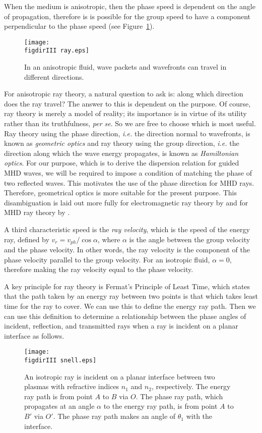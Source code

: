 	When the medium is anisotropic, then the phase speed is dependent on the angle of propagation, therefore is is possible for the group speed to have a component perpendicular to the phase speed (see Figure~\ref{fig: anisotropic ray direction}).
	\begin{figure}
		\centering
		\texttt{[image: \\figdirIII ray.eps]}
		\caption{In an anisotropic fluid, wave packets and wavefronts can travel in different directions.}
		\label{fig: anisotropic ray direction}
	\end{figure}
	For anisotropic ray theory, a natural question to ask is: along which direction does the ray travel? The answer to this is dependent on the purpose. Of course, ray theory is merely a model of reality; its importance is in virtue of its utility rather than its truthfulness, \textit{per se}. So we are free to choose which is most useful. Ray theory using the phase direction, \textit{i.e.} the direction normal to wavefronts, is known as \textit{geometric optics} and ray theory using the group direction, \textit{i.e.} the direction along which the wave energy propagates, is known as \textit{Hamiltonian optics}. For our purpose, which is to derive the dispersion relation for guided MHD waves, we will be required to impose a condition of matching the phase of two reflected waves. This motivates the use of the phase direction for MHD rays. Therefore, geometrical optics is more suitable for the present purpose. This disambiguation is laid out more fully for electromagnetic ray theory by \cite{has88} and for MHD ray theory by \cite{wal77}.
	
	A third characteristic speed is the \textit{ray velocity}, which is the speed of the energy ray, defined by $v_r = v_{ph}/\cos{\alpha}$, where $\alpha$ is the angle between the group velocity and the phase velocity. In other words, the ray velocity is the component of the phase velocity parallel to the group velocity. For an isotropic fluid, $\alpha = 0$, therefore making the ray velocity equal to the phase velocity.
	
	A key principle for ray theory is Fermat's Principle of Least Time, which states that the path taken by an energy ray between two points is that which takes least time for the ray to cover. We can use this to define the energy ray path. Then we can use this definition to determine a relationship between the phase angles of incident, reflection, and transmitted rays when a ray is incident on a planar interface as follows.
	
	\begin{figure}
		\centering
		\texttt{[image: \\figdirIII snell.eps]}
		\caption{An isotropic ray is incident on a planar interface between two plasmas with refractive indices $n_1$ and $n_2$, respectively. The energy ray path is from point $A$ to $B$ via $O$. The phase ray path, which propagates at an angle $\alpha$ to the energy ray path, is from point $A$ to $B'$ via $O'$. The phase ray path makes an angle of $\theta_1$ with the interface.}
		\label{fig: fermat}
	\end{figure}
	
